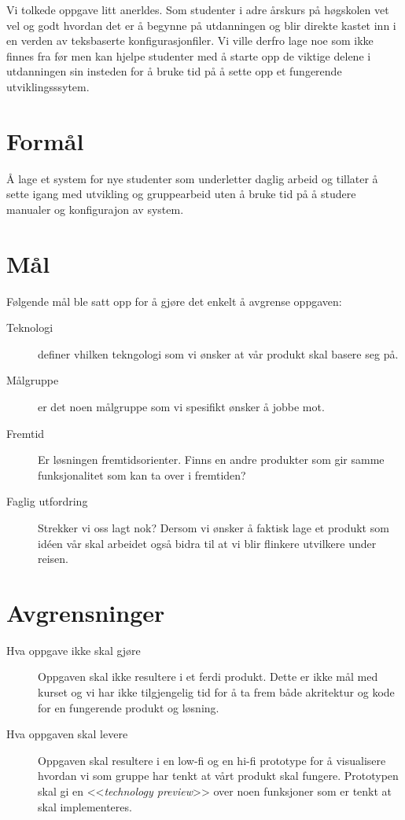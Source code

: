 Vi tolkede oppgave litt anerldes. Som studenter i adre årskurs på høgskolen vet vel og godt hvordan det er å begynne på utdanningen og blir direkte kastet inn i en verden av teksbaserte konfigurasjonfiler. Vi ville derfro lage noe som ikke finnes fra før men kan hjelpe studenter med å starte opp de viktige delene i utdanningen sin insteden for å bruke tid på å sette opp et fungerende utviklingsssytem. 

\section{Formål}
Å lage et system for nye studenter som underletter daglig arbeid og tillater å sette igang med utvikling og gruppearbeid uten å bruke tid på å studere manualer og konfigurajon av system.

\section{Mål}
Følgende mål ble satt opp for å gjøre det enkelt å avgrense oppgaven:
\begin{description}
\item[Teknologi] definer vhilken tekngologi som vi ønsker at vår produkt skal basere seg på.
\item[Målgruppe] er det noen målgruppe som vi spesifikt ønsker å jobbe mot.
\item[Fremtid] Er løsningen fremtidsorienter. Finns en andre produkter som gir samme funksjonalitet som kan ta over i fremtiden?
\item[Faglig utfordring] Strekker vi oss lagt nok? Dersom vi ønsker å faktisk lage et produkt som idéen vår skal arbeidet også bidra til at vi blir flinkere utvilkere under reisen.

\end{description}

\section{Avgrensninger}
\begin{description}
\item[Hva oppgave ikke skal gjøre]
Oppgaven skal ikke resultere i et ferdi produkt. Dette er ikke mål med kurset og vi har ikke tilgjengelig tid for å ta frem både akritektur og kode for en fungerende produkt og løsning.
\item[Hva oppgaven skal levere]
Oppgaven skal resultere i en low-fi og en hi-fi prototype for å visualisere hvordan vi som gruppe har tenkt at vårt produkt skal fungere. Prototypen skal gi en <<\textit{technology preview}>> over noen funksjoner som er tenkt at skal implementeres.
\end{description}

